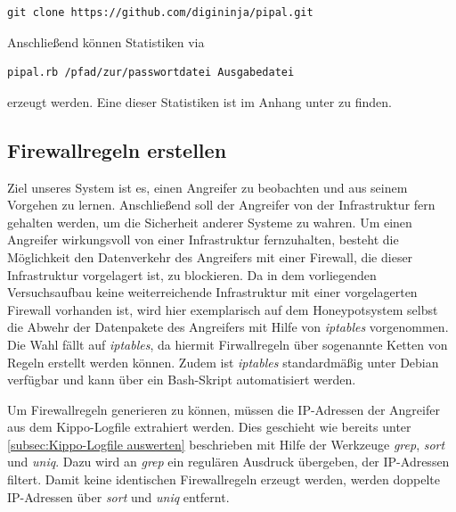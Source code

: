 \begin{lstlisting}[style=customc]
git clone https://github.com/digininja/pipal.git
\end{lstlisting}

Anschließend können Statistiken via

\begin{lstlisting}[style=customc]
pipal.rb /pfad/zur/passwortdatei Ausgabedatei
\end{lstlisting}

erzeugt werden. Eine dieser Statistiken ist im Anhang unter \textit{} zu finden.


\subsection{Firewallregeln erstellen}
\label{subsec:Firewallregeln erstellen}

Ziel unseres System ist es, einen Angreifer zu beobachten und aus seinem Vorgehen zu lernen. Anschließend soll der Angreifer von der Infrastruktur fern gehalten werden, um die Sicherheit anderer Systeme zu wahren. Um einen Angreifer wirkungsvoll von einer Infrastruktur fernzuhalten, besteht die Möglichkeit den Datenverkehr des Angreifers mit einer Firewall, die dieser Infrastruktur vorgelagert ist, zu blockieren. Da in dem vorliegenden Versuchsaufbau keine weiterreichende Infrastruktur mit einer vorgelagerten Firewall vorhanden ist, wird hier exemplarisch auf dem Honeypotsystem selbst die Abwehr der Datenpakete des Angreifers mit Hilfe von \textit{iptables} vorgenommen. Die Wahl fällt auf \textit{iptables}, da hiermit Firwallregeln über sogenannte Ketten von Regeln erstellt werden können. Zudem ist \textit{iptables} standardmäßig unter Debian verfügbar und kann über ein Bash-Skript automatisiert werden. 

Um Firewallregeln generieren zu können, müssen die IP-Adressen der Angreifer aus dem Kippo-Logfile extrahiert werden. Dies geschieht wie bereits unter \ref{subsec:Kippo-Logfile auswerten} beschrieben mit Hilfe der Werkzeuge \textit{grep}, \textit{sort} und \textit{uniq}. Dazu wird an \textit{grep} ein regulären Ausdruck übergeben, der IP-Adressen filtert. Damit keine identischen Firewallregeln erzeugt werden, werden doppelte IP-Adressen über \textit{sort} und \textit{uniq} entfernt.

